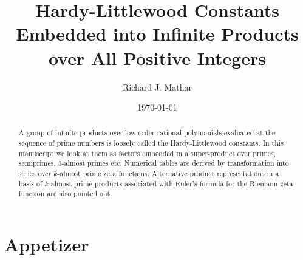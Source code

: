 \documentclass{amsart}
\begin{document}
\title[Embedded Hardy-Littlewood Constants]{Hardy-Littlewood Constants Embedded into Infinite Products over All Positive Integers}

\author{Richard J. Mathar}
\address{Leiden Observatory, Leiden University, P.O. Box 9513, 2300 RA Leiden, The Netherlands}


\date{\today}

\begin{abstract}
A group of infinite products over low-order rational polynomials evaluated
at the sequence of prime numbers is loosely called the Hardy-Littlewood constants.
In this manuscript we look at them
as factors embedded in a super-product over primes, semiprimes, 3-almost primes etc.
Numerical tables are derived by transformation into series over $k$-almost prime
zeta functions. Alternative product representations in a basis of
$k$-almost prime products associated with Euler's formula for the
Riemann zeta function
are also pointed out.
\end{abstract}

\maketitle

\section{Appetizer}\label{sec.intro}
\end{document}
